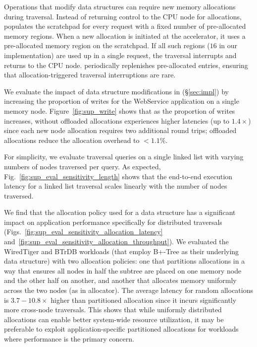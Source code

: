  Operations that modify data structures can require new memory allocations during traversal. Instead of returning control to the CPU node for allocations, \pulse populates the scratchpad for every request with a fixed number of pre-allocated memory regions. When a new allocation is initiated at the \pulse accelerator, it uses a pre-allocated memory region on the scratchpad. If all such regions ($16$ in our implementation) are used up in a single request, the traversal interrupts and returns to the CPU node. \pulse periodically replenishes pre-allocated entries, ensuring that allocation-triggered traversal interruptions are rare.

We evaluate the impact of data structure modifications in \pulse (\S\ref{sec:impl}) by increasing the proportion of writes for the WebService application on a single memory node. Figure~\ref{fig:sup_write} shows that as the proportion of writes increases, \pulse without offloaded allocations experiences higher latencies (up to $1.4\times$) since each new node allocation requires two additional round trips; offloaded allocations reduce the allocation overhead to $<1.1\%$.

 For simplicity, we evaluate traversal queries on a single linked list with varying numbers of nodes traversed per query. As expected, Fig.~\ref{fig:sup_eval_sensitivity_length} shows that the end-to-end execution latency for a linked list traversal scales linearly with the number of nodes traversed.

 We find that the allocation policy used for a data structure has a significant impact on application performance specifically for distributed traversals (Figs.~\ref{fig:sup_eval_sensitivity_allocation_latency} and~\ref{fig:sup_eval_sensitivity_allocation_throughput}). We evaluated the WiredTiger and BTrDB workloads (that employ B+-Tree as their underlying data structure) with two allocation policies: one that partitions allocations in a way that ensures all nodes in half the subtree are placed on one memory node and the other half on another, and another that allocates memory uniformly across the two nodes (as in  allocator). The average latency for random allocations is $3.7-10.8\times$ higher than partitioned allocation since it incurs significantly more cross-node traversals. This shows that while uniformly distributed allocations can enable better system-wide resource utilization, it may be preferable to exploit application-specific partitioned allocations for workloads where performance is the primary concern. 


